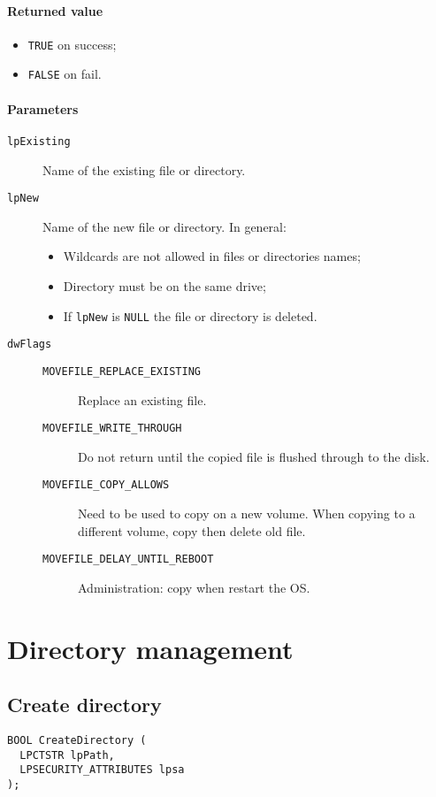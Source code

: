 \paragraph{Returned value}
\begin{itemize}
\item \texttt{TRUE} on success;
\item \texttt{FALSE} on fail.
\end{itemize}

\paragraph{Parameters}
\begin{description}
\item [\texttt{lpExisting}] Name of the existing file or directory.
\item [\texttt{lpNew}] Name of the new file or directory. In general:
\begin{itemize}
\item Wildcards are not allowed in files or directories names;
\item Directory must be on the same drive;
\item If \texttt{lpNew} is \texttt{NULL} the file or directory is deleted.
\end{itemize}
\item [\texttt{dwFlags}]
\begin{description}
\item [\texttt{MOVEFILE\_REPLACE\_EXISTING}] Replace an existing file.
\item [\texttt{MOVEFILE\_WRITE\_THROUGH}] Do not return until the copied file is flushed through to the disk.
\item [\texttt{MOVEFILE\_COPY\_ALLOWS}] Need to be used to copy on a new volume. When copying to a different volume, copy then delete old file.
\item [\texttt{MOVEFILE\_DELAY\_UNTIL\_REBOOT}] Administration: copy when restart the OS.
\end{description}
\end{description}

\section{Directory management}
\subsection{Create directory}
\begin{verbatim}
BOOL CreateDirectory (
  LPCTSTR lpPath,
  LPSECURITY_ATTRIBUTES lpsa
);
\end{verbatim}

